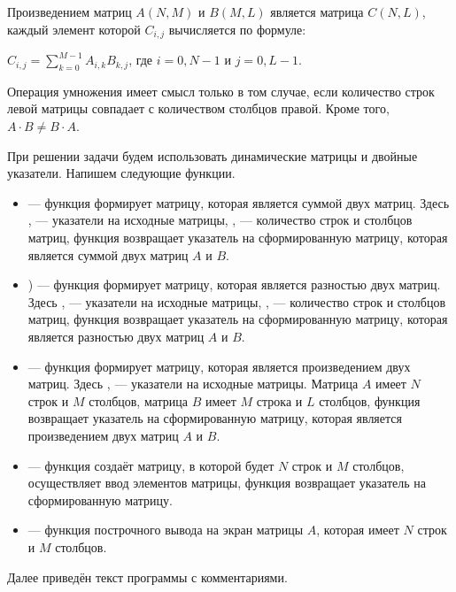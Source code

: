 Произведением матриц $A(N,M)$ и $B(M,L)$ является матрица $C(N,L)$, каждый элемент которой  $C_{i,j}$ вычисляется по формуле:

 $C_{i,j}=\sum\limits_{k=0}^{M-1}A_{i,k}B_{k,j}$, где $i = 0, N-1$ и $j = 0, L-1$. 

Операция умножения имеет смысл только в том случае, если количество строк левой матрицы совпадает с количеством столбцов
правой. Кроме того,  $A\cdot B\neq B\cdot A$. 

При решении задачи будем использовать динамические матрицы и двойные указатели. Напишем следующие функции.

\begin{itemize}
\item {} --- функция формирует матрицу, которая является суммой двух
матриц. Здесь ,  --- указатели на исходные матрицы, ,  --- количество строк и столбцов матриц, функция возвращает
указатель на сформированную матрицу, которая является суммой двух матриц $A$ и $B$.
\item {})  --- функция формирует матрицу, которая является разностью двух
матриц. Здесь ,  --- указатели на исходные матрицы, ,  --- количество строк и столбцов матриц, функция возвращает
указатель на сформированную матрицу, которая является разностью двух матриц $A$ и $B$.
\item {} --- функция формирует матрицу, которая является
произведением двух матриц. Здесь ,  --- указатели на исходные матрицы. 
Матрица $A$ имеет $N$ строк и $M$ столбцов, матрица $B$ имеет $M$ строка и $L$ столбцов, функция возвращает указатель 
на сформированную матрицу, которая является произведением
двух матриц $A$ и $B$.
\item {} --- функция создаёт матрицу, в которой будет $N$ строк и $M$ столбцов, 
осуществляет ввод элементов матрицы, функция возвращает указатель на сформированную матрицу.
\item {} --- функция построчного вывода на экран матрицы $A$, которая 
имеет $N$ строк и $M$ столбцов.
\end{itemize}
Далее приведён текст программы с комментариями.
